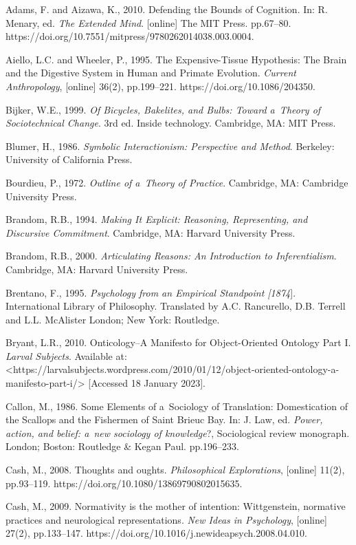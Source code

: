 Adams, F. and Aizawa, K., 2010. Defending the Bounds of Cognition. In: R. Menary, ed. \textit{The Extended Mind}. [online] The MIT Press. pp.67–80. https://doi.org/10.7551/mitpress/9780262014038.003.0004.

Aiello, L.C. and Wheeler, P., 1995. The Expensive-Tissue Hypothesis: The Brain and the Digestive System in Human and Primate Evolution. \textit{Current Anthropology}, [online] 36(2), pp.199–221. https://doi.org/10.1086/204350.

Bijker, W.E., 1999. \textit{Of Bicycles, Bakelites, and Bulbs: Toward a~Theory of Sociotechnical Change}. 3rd ed. Inside technology. Cambridge, MA: MIT Press.

Blumer, H., 1986. \textit{Symbolic Interactionism: Perspective and Method}. Berkeley: University of California Press.

Bourdieu, P., 1972. \textit{Outline of a~Theory of Practice}. Cambridge, MA: Cambridge University Press.

Brandom, R.B., 1994. \textit{Making It Explicit: Reasoning, Representing, and Discursive Commitment}. Cambridge, MA: Harvard University Press.

Brandom, R.B., 2000. \textit{Articulating Reasons: An Introduction to Inferentialism}. Cambridge, MA: Harvard University Press.

Brentano, F., 1995. \textit{Psychology from an Empirical Standpoint [1874}]. International Library of Philosophy. Translated by A.C. Rancurello, D.B. Terrell and L.L. McAlister London; New York: Routledge.

Bryant, L.R., 2010. Onticology–A Manifesto for Object-Oriented Ontology Part I. \textit{Larval Subjects}. Available at: {\textless}https://larvalsubjects.wordpress.com/2010/01/12/object-oriented-ontology-a-manifesto-part-i/{\textgreater} [Accessed 18 January 2023].

Callon, M., 1986. Some Elements of a~Sociology of Translation: Domestication of the Scallops and the Fishermen of Saint Brieuc Bay. In: J. Law, ed. \textit{Power, action, and belief: a~new sociology of knowledge}?, Sociological review monograph. London; Boston: Routledge \& Kegan Paul. pp.196–233.

Cash, M., 2008. Thoughts and oughts. \textit{Philosophical Explorations}, [online] 11(2), pp.93–119. https://doi.org/10.1080/13869790802015635.

Cash, M., 2009. Normativity is the mother of intention: Wittgenstein, normative practices and neurological representations. \textit{New Ideas in Psychology}, [online] 27(2), pp.133–147. https://doi.org/10.1016/j.newideapsych.2008.04.010.

